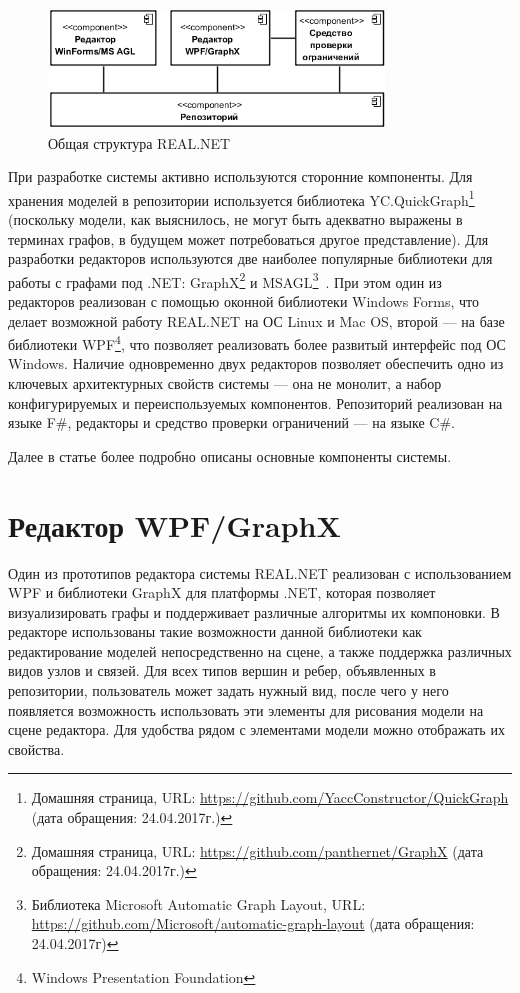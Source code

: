 \documentclass{spisok-article}
\begin{document}
\begin{figure}[ht]
	\centering
	\includegraphics[width=0.8\textwidth]{architecture.png}
	\caption{Общая структура REAL.NET}
	\label{image:architecture}
\end{figure}

При разработке системы активно используются сторонние компоненты. Для хранения моделей в репозитории используется библиотека YC.QuickGraph\footnote{Домашняя страница, URL: \url{https://github.com/YaccConstructor/QuickGraph} (дата обращения: 24.04.2017г.)} (поскольку модели, как выяснилось, не могут быть адекватно выражены в терминах графов, в будущем может потребоваться другое представление). Для разработки редакторов используются две наиболее популярные библиотеки для работы с графами под .NET: GraphX\footnote{Домашняя страница, URL: \url{https://github.com/panthernet/GraphX} (дата обращения: 24.04.2017г.)} и MSAGL\footnote{Библиотека Microsoft Automatic Graph Layout, URL: \url{https://github.com/Microsoft/automatic-graph-layout} (дата обращения: 24.04.2017г)}~\cite{pupyrev2010bundling}. При этом один из редакторов реализован с помощью оконной библиотеки Windows Forms, что делает возможной работу REAL.NET на ОС Linux и Mac OS, второй --- на базе библиотеки WPF\footnote{Windows Presentation Foundation}, что позволяет реализовать более развитый интерфейс под ОС Windows. Наличие одновременно двух редакторов позволяет обеспечить одно из ключевых архитектурных свойств системы --- она не монолит, а набор конфигурируемых и переиспользуемых компонентов. Репозиторий реализован на языке F\#, редакторы и средство проверки ограничений --- на языке C\#.

Далее в статье более подробно описаны основные компоненты системы.

\section{Редактор WPF/GraphX}

Один из прототипов редактора системы REAL.NET реализован с использованием WPF и библиотеки GraphX для платформы .NET, которая позволяет визуализировать графы и поддерживает различные алгоритмы их компоновки. В редакторе использованы такие возможности данной библиотеки как редактирование моделей непосредственно на сцене, а также поддержка различных видов узлов и связей. Для всех типов вершин и ребер, объявленных в репозитории, пользователь может задать нужный вид, после чего у него появляется возможность использовать эти элементы для рисования модели на сцене редактора. Для удобства рядом с элементами модели можно отображать их свойства.
\end{document}
